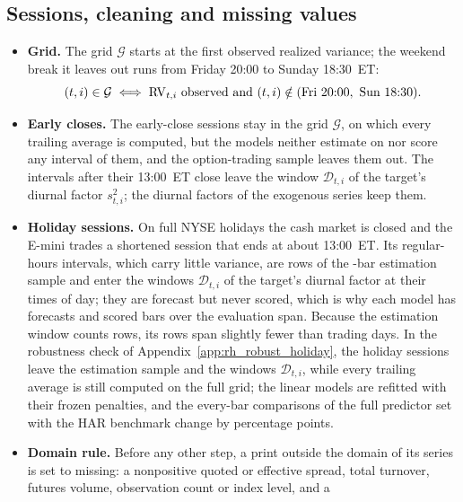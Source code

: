 \subsection{Sessions, cleaning and missing values}
\label{app:rh_dp_sessions}
\begin{itemize}
\item \textbf{Grid.} The grid $\mathcal G$ starts at the first observed realized variance; the weekend break it leaves
  out runs from Friday 20:00 to Sunday 18:30~ET:
  \[
    (t,i) \in \mathcal{G} \iff \mathrm{RV}_{t,i} \text{ observed and } (t,i) \notin (\text{Fri } 20{:}00,\ \text{Sun } 18{:}30) .
  \]
\item \textbf{Early closes.} The early-close sessions stay in the grid $\mathcal G$, on which every trailing average is
  computed, but the models neither estimate on nor score any interval of them, and the option-trading sample
  leaves them out. The intervals after their 13:00~ET close leave the window $\mathcal D_{t,i}$ of the target's
  diurnal factor $s^2_{t,i}$; the diurnal factors of the exogenous series keep them.
\item \textbf{Holiday sessions.} On full NYSE holidays the cash market is closed and the E-mini trades a shortened
  session that ends at about 13:00~ET. Its regular-hours intervals, which carry little variance, are rows of the
  \rhorNBars-bar estimation sample and enter the windows $\mathcal D_{t,i}$ of the target's diurnal factor at their
  times of day; they are forecast but never scored, which is why each model has \rhorNTreeBars{} forecasts
  and \rhorNIntB{} scored bars over the evaluation span. Because the estimation window counts rows, its
  \rhorWindowBars{} rows span slightly fewer than \rhorWindowDays{} trading days. In the robustness check of
  Appendix~\ref{app:rh_robust_holiday}, the holiday sessions leave the estimation sample and the windows $\mathcal D_{t,i}$, while
  every trailing average is still computed on the full grid; the linear models are refitted with their frozen
  penalties, and the every-bar comparisons of the full predictor set with the HAR benchmark change by
  \rhholEffCABarPpRng{} percentage points.
\item \textbf{Domain rule.} Before any other step, a print outside the domain of its series is set to missing: a
  nonpositive quoted or effective spread, total turnover, futures volume, observation count or index level, and a

\end{itemize}
